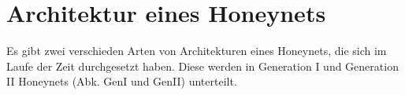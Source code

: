 \section{Architektur eines Honeynets}
Es gibt zwei verschieden Arten von Architekturen eines Honeynets, die sich im Laufe der Zeit durchgesetzt haben. Diese werden in Generation I und Generation II Honeynets (Abk. GenI und GenII) unterteilt.

